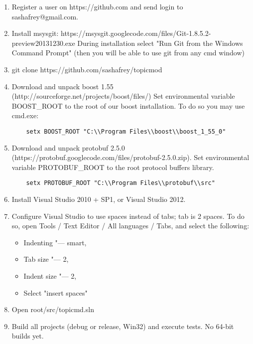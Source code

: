 \documentclass[11pt,a4paper,twoside]{report}
\begin{document}
\begin{enumerate}
\item Register a user on https://github.com and send login to sashafrey@gmail.com.
\item Install msysgit:
	https://msysgit.googlecode.com/files/Git-1.8.5.2-preview20131230.exe
   During installation select "Run Git from the Windows Command Prompt"
   (then you will be able to use git from any cmd window)
\item git clone https://github.com/sashafrey/topicmod
\item Download and unpack boost 1.55 (http://sourceforge.net/projects/boost/files/)
   Set environmental variable BOOST\_ROOT to the root of our boost installation. To do so you may use cmd.exe:
 \begin{verbatim}
 	setx BOOST_ROOT "C:\\Program Files\\boost\\boost_1_55_0"
 \end{verbatim}
\item Download and unpack protobuf 2.5.0 (https://protobuf.googlecode.com/files/protobuf-2.5.0.zip).
   Set environmental variable PROTOBUF\_ROOT to the root protocol buffers library.
  \begin{verbatim}
	setx PROTOBUF_ROOT "C:\\Program Files\\protobuf\\src"
  \end{verbatim}
\item Install Visual Studio 2010 + SP1, or Visual Studio 2012.
\item Configure Visual Studio to use spaces instead of tabs; tab is 2 spaces.
    To do so, open Tools / Text Editor / All languages / Tabs, and select the following:
    \begin{itemize}
        \item Indenting "--- smart,
        \item Tab size "--- 2,
        \item Indent size "--- 2,
        \item Select "insert spaces"
    \end{itemize}
\item Open root/src/topicmd.sln
\item Build all projects (debug or release, Win32) and execute tests. No 64-bit builds yet.
\end{enumerate}
\end{document}
